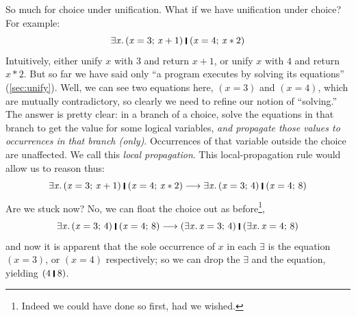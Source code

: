 \documentclass[acmsmall,review,dvipsnames]{acmart}
\newcommand{\Varid}[1]{\mathit{#1}}
\newcommand{\movesto}{\longrightarrow}
\begin{document}
So much for choice under unification.  What if we have
unification under choice?  For example:
$$
\ensuremath{\exists\Varid{x}.\,(\Varid{x}\mathrel{=}\mathrm{3};\,\Varid{x}\mathbin{+}\mathrm{1})\;\rule[-0.3mm]{0.5mm}{2.5mm}\;(\Varid{x}\mathrel{=}\mathrm{4};\,\Varid{x}\mathbin{*}\mathrm{2})}
$$
Intuitively, either unify \ensuremath{\Varid{x}} with \ensuremath{\mathrm{3}} and return \ensuremath{\Varid{x}\mathbin{+}\mathrm{1}}, or unify \ensuremath{\Varid{x}} with \ensuremath{\mathrm{4}} and return \ensuremath{\Varid{x}\mathbin{*}\mathrm{2}}.
But so far we have said only ``a program executes by solving its equations'' (\cref{sec:unify}).
Well, we can see two equations here, \ensuremath{(\Varid{x}\mathrel{=}\mathrm{3})} and \ensuremath{(\Varid{x}\mathrel{=}\mathrm{4})}, which are mutually contradictory,
so clearly we need to refine our notion of ``solving.''
The answer is pretty clear: in a branch of a choice, solve the equations in that branch
to get the value for some logical variables, \emph{and propagate those values to occurrences in
  that branch (only)}. Occurrences of that variable outside the choice are unaffected.  We call
this \emph{local propagation}.
This local-propagation rule would allow us to reason thus:
$$
\ensuremath{\exists\Varid{x}.\,(\Varid{x}\mathrel{=}\mathrm{3};\,\Varid{x}\mathbin{+}\mathrm{1})\;\rule[-0.3mm]{0.5mm}{2.5mm}\;(\Varid{x}\mathrel{=}\mathrm{4};\,\Varid{x}\mathbin{*}\mathrm{2})} \movesto  \ensuremath{\exists\Varid{x}.\,(\Varid{x}\mathrel{=}\mathrm{3};\,\mathrm{4})\;\rule[-0.3mm]{0.5mm}{2.5mm}\;(\Varid{x}\mathrel{=}\mathrm{4};\,\mathrm{8})}
$$
Are we stuck now?  No, we can float the choice out as
before\footnote{Indeed we could have done so first, had we wished.},
$$
\ensuremath{\exists\Varid{x}.\,(\Varid{x}\mathrel{=}\mathrm{3};\,\mathrm{4})\;\rule[-0.3mm]{0.5mm}{2.5mm}\;(\Varid{x}\mathrel{=}\mathrm{4};\,\mathrm{8})} \movesto \ensuremath{(\exists\Varid{x}.\,\Varid{x}\mathrel{=}\mathrm{3};\,\mathrm{4})\;\rule[-0.3mm]{0.5mm}{2.5mm}\;(\exists\Varid{x}.\,\Varid{x}\mathrel{=}\mathrm{4};\,\mathrm{8})}
$$
and now it is apparent that the sole occurrence of \ensuremath{\Varid{x}} in each \ensuremath{\exists} is the equation
\ensuremath{(\Varid{x}\mathrel{=}\mathrm{3})}, or \ensuremath{(\Varid{x}\mathrel{=}\mathrm{4})} respectively; so we can drop the \ensuremath{\exists} and the equation, yielding \ensuremath{(\mathrm{4}\;\rule[-0.3mm]{0.5mm}{2.5mm}\;\mathrm{8})}.
\end{document}
